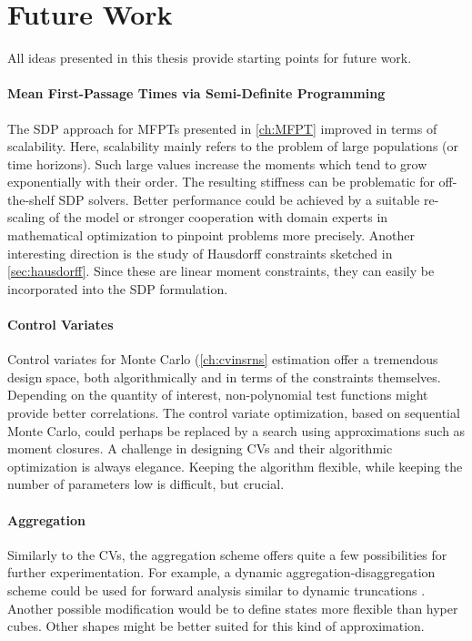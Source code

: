 \section{Future Work}
All ideas presented in this thesis provide starting points for future work.

\paragraph{Mean First-Passage Times via Semi-Definite Programming}
The \ac{SDP} approach for \acp{MFPT} presented in \autoref{ch:MFPT} improved in terms of scalability.
Here, scalability mainly refers to the problem of large populations (or time horizons).
Such large values increase the moments which tend to grow exponentially with their order.
The resulting stiffness can be problematic for off-the-shelf \ac{SDP} solvers.
Better performance could be achieved by a suitable re-scaling of the model or stronger cooperation with domain experts in mathematical optimization to pinpoint problems more precisely.
Another interesting direction is the study of Hausdorff constraints sketched in \autoref{sec:hausdorff}.
Since these are linear moment constraints, they can easily be incorporated into the \ac{SDP} formulation.

\paragraph{Control Variates}
Control variates for Monte Carlo (\autoref{ch:cvinsrns} estimation offer a tremendous design space, both algorithmically and in terms of the constraints themselves.
Depending on the quantity of interest, non-polynomial test functions might provide better correlations.
The control variate optimization, based on sequential Monte Carlo, could perhaps be replaced by a search using approximations such as moment closures.
A challenge in designing \acp{CV} and their algorithmic optimization is always elegance.
Keeping the algorithm flexible, while keeping the number of parameters low is difficult, but crucial.

\paragraph{Aggregation}
Similarly to the \aclp{CV}, the aggregation scheme offers quite a few possibilities for further experimentation.
For example, a dynamic aggregation-disaggregation scheme could be used for forward analysis similar to dynamic truncations \parencite{andreychenko2011parameter}.
Another possible modification would be to define states more flexible than hyper cubes.
Other shapes might be better suited for this kind of approximation.


